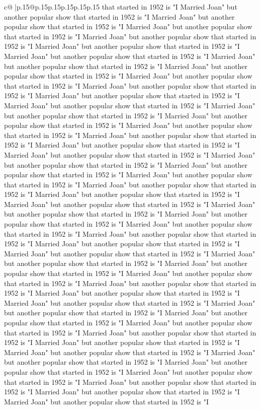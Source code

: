 \documentclass{article}
\begin{document}
{\begin{supertabular}{c@{$\;$}|p{.15\linewidth}@{}p{.15\linewidth}p{.15\linewidth}p{.15\linewidth}p{.15\linewidth}p{.15\linewidth}}
{{{that started in 1952 is "I Married Joan" but another popular show that started in 1952 is "I Married Joan" but another popular show that started in 1952 is "I Married Joan" but another popular show that started in 1952 is "I Married Joan" but another popular show that started in 1952 is "I Married Joan" but another popular show that started in 1952 is "I Married Joan" but another popular show that started in 1952 is "I Married Joan" but another popular show that started in 1952 is "I Married Joan" but another popular show that started in 1952 is "I Married Joan" but another popular show that started in 1952 is "I Married Joan" but another popular show that started in 1952 is "I Married Joan" but another popular show that started in 1952 is "I Married Joan" but another popular show that started in 1952 is "I Married Joan" but another popular show that started in 1952 is "I Married Joan" but another popular show that started in 1952 is "I Married Joan" but another popular show that started in 1952 is "I Married Joan" but another popular show that started in 1952 is "I Married Joan" but another popular show that started in 1952 is "I Married Joan" but another popular show that started in 1952 is "I Married Joan" but another popular show that started in 1952 is "I Married Joan" but another popular show that started in 1952 is "I Married Joan" but another popular show that started in 1952 is "I Married Joan" but another popular show that started in 1952 is "I Married Joan" but another popular show that started in 1952 is "I Married Joan" but another popular show that started in 1952 is "I Married Joan" but another popular show that started in 1952 is "I Married Joan" but another popular show that started in 1952 is "I Married Joan" but another popular show that started in 1952 is "I Married Joan" but another popular show that started in 1952 is "I Married Joan" but another popular show that started in 1952 is "I Married Joan" but another popular show that started in 1952 is "I Married Joan" but another popular show that started in 1952 is "I Married Joan" but another popular show that started in 1952 is "I Married Joan" but another popular show that started in 1952 is "I Married Joan" but another popular show that started in 1952 is "I Married Joan" but another popular show that started in 1952 is "I Married Joan" but another popular show that started in 1952 is "I Married Joan" but another popular show that started in 1952 is "I Married Joan" but another popular show that started in 1952 is "I Married Joan" but another popular show that started in 1952 is "I Married Joan" but another popular show that started in 1952 is "I Married Joan" but another popular show that started in 1952 is "I Married Joan" but another popular show that started in 1952 is "I Married Joan" but another popular show that started in 1952 is "I Married Joan" but another popular show that started in 1952 is "I Married Joan" but another popular show that started in 1952 is "I Married Joan" but another popular show that started in 1952 is "I Married Joan" but another popular show that started in 1952 is "I Married Joan" but another popular show that started in 1952 is "I }}}
\end{supertabular}}
\end{document}
